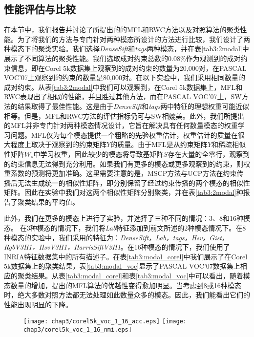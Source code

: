 \subsection{性能评估与比较}
在本节中，我们报告并讨论了所提出的的MFL和RWC方法以及对照算法的聚类性能。为了将我们的方法与专门针对两种模态所设计的方法进行比较，我们设计了两种模态下的聚类实验。我们选择\textit{DenseSift}和\textit{tags}两种模态，并在表\ref{tab3:2modal}中展示了不同算法的聚类性能。我们选取成对约束总数的$0.08\%$作为观测到的成对约束信息，即在Corel 5k数据集上观察到的成对约束的数量为20,000对，在PASCAL VOC'07上观察到的约束的数量是80,000对。在以下实验中，我们采用相同数量的成对约束。从表\ref{tab3:2modal}中我们可以观察到，在Corel 5k数据集上，MFL和RWC表现出了相似的性能，并且胜过其他方法，而在PASCAL VOC'07上，SW方法的结果取得了最佳性能。这是由于\textit{DenseSift}和\textit{tags}两中特征的理想权重可能近似相等。但是，MFL和RWC方法的评估指标仍可与SW相媲美。此外，我们所提出的MFL并非专门针对两种模态情况设计，它旨在解决具有任何数量模态的权重学习问题。MFL仅为每个模态提供一个粗略的先验权重估计，权重估计的质量在很大程度上取决于观察到的约束矩阵$ {Y} $的质量。由于MFL是从约束矩阵$ {Y} $和稀疏相似性矩阵${W}_s $中学习权重，因此较少的模态将导致基矩阵$ {S} $存在大量的全零行，观察到的约束信息无法得到充分利用。如果我们有更多的模态或更多观察到的约束，则权重系数的预测将更加准确。这里需要注意的是，MSCP方法与UCP方法在约束传播后无法生成统一的相似性矩阵，即分别保留了经过约束传播的两个模态的相似性矩阵。因此在实验中我们对这两个相似性矩阵分别聚类，并在表\ref{tab3:2modal}种报告了聚类结果的平均值。

此外，我们在更多的模态上进行了实验，并选择了三种不同的情况：3、8和16种模态。 在3种模态的情况下，我们将\textit{Lab}特征添加到前文所述的2种模态情况下。在8种模态的实验中，我们采用的特征为：\textit{DenseSift，Lab，tags，Hsv，Gist，RgbV3H1，HsvV3H1，HarrisSiftV3H1}。在16种模态的情况下，我们使用了INRIA特征数据集中的所有描述子。在表\ref{tab3:modal_corel}中我们展示了在Corel 5k数据集上的聚类结果，表\ref{tab3:modal_voc}显示了PASCAL VOC'07数据集上相应的聚类结果。从表\ref{tab3:modal_corel}和表\ref{tab3:modal_voc}中可以看出，随着模态数量的增加，提出的MFL算法的优越性变得愈加明显。当考虑到8或16种模态时，绝大多数对照方法都无法处理如此数量众多的模态。因此，我们能看出它们的性能出现明显的下降。

\begin{figure}[t]
    \centering
    \texttt{[image: chap3/corel5k\_voc\_1\_16\_acc.eps]}
    \texttt{[image: chap3/corel5k\_voc\_1\_16\_nmi.eps]}
	\label{fig3:1_16}
\end{figure} 

